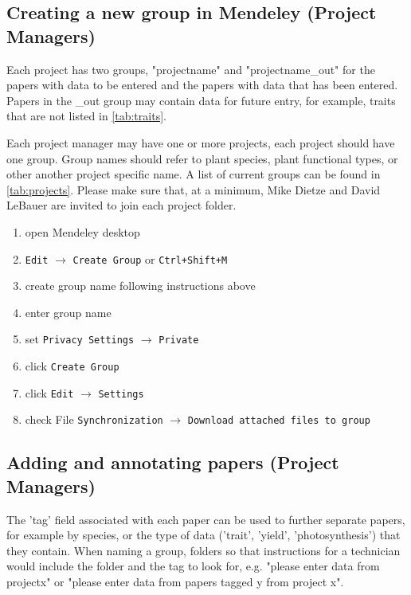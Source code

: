 \documentclass[12pt,english,portrait]{article}
\begin{document}
\subsection{Creating a new group in Mendeley (Project Managers)} \label{sec:groups}

Each project has two groups, "projectname" and "projectname\_out" for the papers with data to be entered and the papers with data that has been entered. 
Papers in the \_out group may contain data for future entry, for example, traits that are not listed in \autoref{tab:traits}.

Each project manager may have one or more projects, each project should have one group.
Group names should refer to plant species, plant functional types, or other another project specific name. 
A list of current groups can be found in \autoref{tab:projects}. 
Please make sure that, at a minimum, Mike Dietze and David LeBauer are invited to join each project folder.


\begin{enumerate}
\item open Mendeley desktop 
\item \verb+Edit+ $\to$ \verb+Create Group+ or \texttt{Ctrl+Shift+M}
\item create group name following instructions above
\item enter group name 
\item set \verb+Privacy Settings+ $\to$ \verb+Private+
\item click \verb+Create Group+
\item click \verb+Edit+ $\to$ \verb+Settings+
\item check File \verb+Synchronization+ $\to$ \verb+Download attached files to group+
\end{enumerate}

\subsection{Adding and annotating papers (Project Managers)}\label{sec:annotate}

The 'tag' field associated with each paper can be used to further separate papers, for example by species, or the type of data ('trait', 'yield', 'photosynthesis') that they contain.  
When naming a group,  folders so that instructions for a technician would include the folder and the tag to look for, e.g.  "please enter data from projectx" or "please enter data from papers tagged y from project x".
\end{document}
